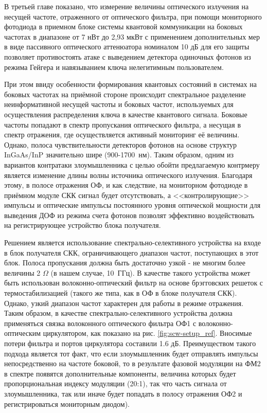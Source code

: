  В третьей главе показано, что измерение величины оптического излучения на несущей частоте, отраженного от оптического фильтра, при помощи мониторного фотодиода в приемном блоке системы квантовой коммуникации на боковых частотах в диапазоне от 7 нВт до 2,93 мкВт с применением дополнительных мер в виде пассивного оптического аттенюатора номиналом 10 дБ для его защиты позволяет противостоять атаке с выведением детектора одиночных фотонов из режима Гейгера и навязыванием ключа нелегитимным пользователем. 
 
 При этом ввиду особенности формирования квантовых состояний в системах на боковых частотах на приёмной стороне происходит спектральное разделение неинформативной несущей частоты и боковых частот, используемых для осуществления распределения ключа в качестве квантового сигнала. Боковые частоты попадают в спектр пропускания оптического фильтра, а несущая в спектр отражения, где осуществляется активный мониторинг её величины. Однако, полоса чувствительности детекторов фотонов на основе структур InGaAs/InP значительно шире (900-1700~нм). Таким образом, одним из вариантов контратаки злоумышленника с целью обойти предлагаемую контрмеру является изменение длины волны источника оптического излучения. Благодаря этому, в полосе отражения ОФ, и как следствие, на мониторном фотодиоде в приёмном модуле СКК сигнал будет отсутствовать, а <<контролирующие>> импульсы и оптические импульсы постоянного уровня оптической мощности для выведения ДОФ из режима счета фотонов позволят эффективно воздействовать на регистрирующее устройство блока получателя.

Решением является использование спектрально-селективного устройства на входе в блок получателя СКК, ограничивающего диапазон частот, поступающих в этот блок. Полоса пропускания должна быть достаточно узкой - не многим более величины 2 $\Omega$ (в нашем случае, 10~ГГц). В качестве такого устройства может быть использован волоконно-оптический фильтр на основе брэгговских решеток с термостабилизацией (такого же типа, как в ОФ в блоке получателя СКК). Однако, узкий диапазон частот характерен для работы в режиме отражения. Таким образом, в качестве спектрально-селективного устройства должна применяться связка волоконного оптического фильтра ОФ1 с волоконно-оптическим циркулятором, как показано на рис. \ref{fig:scw-setup_ref}. Вносимые потери фильтра и портов циркулятора составили 1.6 дБ. Преимуществом такого подхода является тот факт, что если злоумышленник будет отправлять импульсы непосредственно на частоте боковой, то в результате фазовой модуляции на ФМ2 в спектре появятся дополнительные компоненты, величина которых будет пропорциональная индексу модуляции (20:1), так что часть сигнала от злоумышленника, так или иначе будет попадать в полосу отражения ОФ2 и регистрироваться мониторным диодом).  



